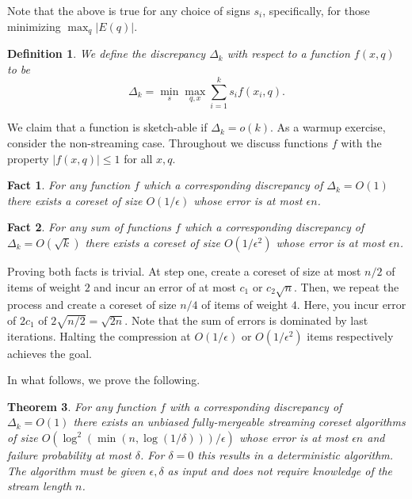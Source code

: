 \documentclass{article} %
\newtheorem{theorem}{Theorem}[section]
\newtheorem{fact}[theorem]{Fact}
\newcommand{\eps}{\epsilon}
\newtheorem{definition}{Definition}
\begin{document}
%
%
Note that the above is true for any choice of signs $s_i$, specifically, for those minimizing $\max_q | E(q)|$.
\begin{definition}
We define the discrepancy $\Delta_k$ with respect to a function $f(x,q)$ to be  
\[\Delta_k = \min_s \max_{q,x} \sum_{i=1}^{k} s_i f(x_i,q). \] 
\end{definition}
\noindent We claim that a function is sketch-able if $\Delta_k = o(k)$. 
As a warmup exercise, consider the non-streaming case. Throughout we discuss functions $f$ with the property $|f(x,q)| \leq 1$ for all $x,q$.


\begin{fact}
For any function $f$ which a corresponding discrepancy of $\Delta_k = O(1)$ there exists a coreset of size 
$O(1/\eps)$ whose error is at most $\eps n$.
\end{fact}
\begin{fact}
For any sum of functions $f$ which a corresponding discrepancy of $\Delta_k = O(\sqrt{k})$ there exists a coreset of size 
$O(1/\eps^2)$ whose error is at most $\eps n$.
\end{fact}

\noindent Proving both facts is trivial. 
At step one, create a coreset of size at most $n/2$ of items of weight $2$ and incur an error of at most $c_1$ or $c_2 \sqrt{n}$.
Then, we repeat the process and create a coreset of size $n/4$ of items of weight $4$. Here, you incur error of $2c_1$ of $2\sqrt{n/2}  = \sqrt{2n}$.
Note that the sum of errors is dominated by last iterations. 
Halting the compression at $O(1/\eps)$ or $O(1/\eps^2)$ items respectively achieves the goal.
 
In what follows, we prove the following.
\begin{theorem} \label{thm:streaming}
For any function $f$ with a corresponding discrepancy of $\Delta_k = O(1)$ there exists an unbiased fully-mergeable streaming coreset algorithms of size 
$O\left(\log^2\left(\min(n, \log(1/\delta)) \right)/\eps\right)$ whose error is at most $\eps n$ and failure probability at most $\delta$. For $\delta=0$ this results in a deterministic algorithm. The algorithm must be given $\eps, \delta$ as input and does not require knowledge of the stream length $n$.
\end{theorem}
\end{document}
